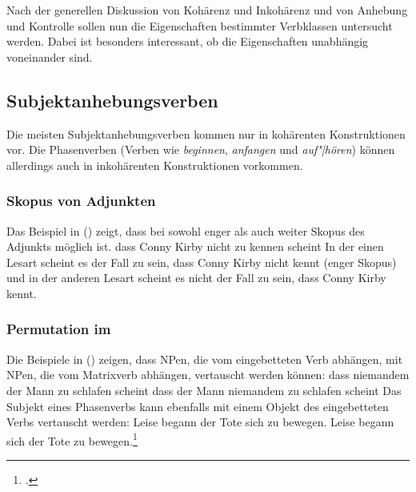 Nach der generellen Diskussion von Kohärenz und Inkohärenz und von Anhebung und Kontrolle
sollen nun die Eigenschaften bestimmter Verbklassen untersucht werden. Dabei ist besonders
interessant, ob die Eigenschaften unabhängig voneinander sind.

\subsection{Subjektanhebungsverben}
\label{sec-subj-raising-verbs-phen}
\label{sec-phase-verbs-phen}

Die meisten Subjektanhebungsverben kommen nur in kohärenten Konstruktionen vor.
Die Phasenverben (Verben wie \emph{beginnen}, \emph{anfangen} und \emph{auf"|hören})
können allerdings auch in inkohärenten Konstruktionen vorkommen.

\subsubsection{Skopus von Adjunkten}
\label{sec-subj-rais-scope}

Das Beispiel in () zeigt, dass bei  sowohl enger als auch weiter
Skopus des Adjunkts möglich ist.
\eal
dass Conny Kirby nicht zu kennen scheint
\zl
In der einen Lesart scheint es der Fall zu sein, dass Conny Kirby nicht kennt (enger Skopus) und in der
anderen Lesart scheint es nicht der Fall zu sein, dass Conny Kirby kennt.




\subsubsection{Permutation im \mf}
\label{sec-subj-rais-perm-mf}

Die Beispiele in () zeigen, dass NPen, die vom eingebetteten Verb abhängen,
mit NPen, die vom Matrixverb abhängen, vertauscht werden können:
\eal
\ex 
dass niemandem    der Mann zu schlafen scheint
\ex 
dass der Mann niemandem zu schlafen scheint
\zl
Das Subjekt eines Phasenverbs kann ebenfalls mit einem Objekt des
eingebetteten Verbs vertauscht werden:
\eal
\ex 
Leise   begann der Tote     sich zu bewegen.
\ex 
Leise   begann sich der Tote     zu bewegen.\footnote{
        .
    }
\zl


